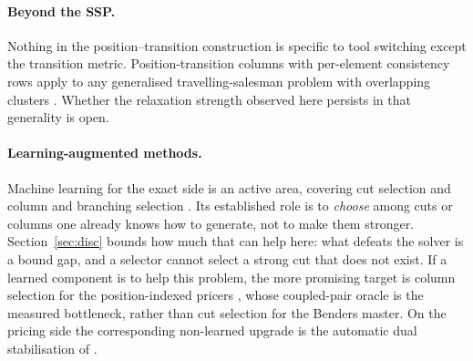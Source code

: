 \paragraph{Beyond the SSP.}
Nothing in the position--transition construction is specific to tool switching except
the transition metric. Position-transition columns with per-element consistency rows
apply to any generalised travelling-salesman problem with overlapping clusters
\citep{Pop2024}. Whether the relaxation strength observed here persists in that
generality is open.

\paragraph{Learning-augmented methods.}
Machine learning for the exact side is an active area, covering cut selection
\citep{Tang2020,DezaKhalil2023} and column and branching selection
\citep{Bengio2021,Gasse2019,Morabit2021}. Its established role is to \emph{choose}
among cuts or columns one already knows how to generate, not to make them stronger.
Section~\ref{sec:disc} bounds how much that can help here: what defeats the solver is
a bound gap, and a selector cannot select a strong cut that does not exist. If a
learned component is to help this problem, the more promising target is column
selection for the position-indexed pricers \citep{Morabit2021}, whose coupled-pair
oracle is the measured bottleneck, rather than cut selection for the Benders master.
On the pricing side the corresponding non-learned upgrade is the automatic dual
stabilisation of \citet{Pessoa2018}.
